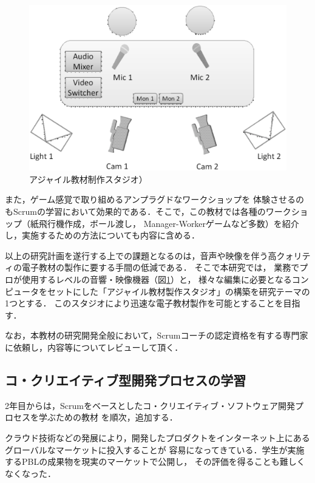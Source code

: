 \documentclass[a4j,9pt,twoside,twocolumn]{jsarticle}
\begin{document}
\begin{figure}[h]
\begin{center}
\includegraphics[width=\linewidth]{figs/studio.eps}
\caption{アジャイル教材制作スタジオ）}
\label{fig:studio}
\end{center}
\end{figure}

	また，ゲーム感覚で取り組めるアンプラグドなワークショップを
	体験させるのもScrumの学習において効果的である．そこで，この教材では各種のワークショップ（紙飛行機作成，ボール渡し，
	Manager-Workerゲームなど多数）を紹介し，実施するための方法についても内容に含める．

	以上の研究計画を遂行する上での課題となるのは，音声や映像を伴う高クォリティの電子教材の製作に要する手間の低減である．
	そこで本研究では，
	業務でプロが使用するレベルの音響・映像機器（図\ref{fig:studio}）と，
	様々な編集に必要となるコンピュータをセットにした「アジャイル教材製作スタジオ」の構築を研究テーマの1つとする．
	このスタジオにより迅速な電子教材製作を可能とすることを目指す．

	なお，本教材の研究開発全般において，Scrumコーチの認定資格を有する専門家に依頼し，内容等についてレビューして頂く．

\subsection{コ・クリエイティブ型開発プロセスの学習}
	
	2年目からは，Scrumをベースとしたコ・クリエイティブ・ソフトウェア開発プロセスを学ぶための教材
	を順次，追加する．

	クラウド技術などの発展により，開発したプロダクトをインターネット上にあるグローバルなマーケットに投入することが
	容易になってきている．学生が実施するPBLの成果物を現実のマーケットで公開し，
	その評価を得ることも難しくなくなった．
	
\end{document}
